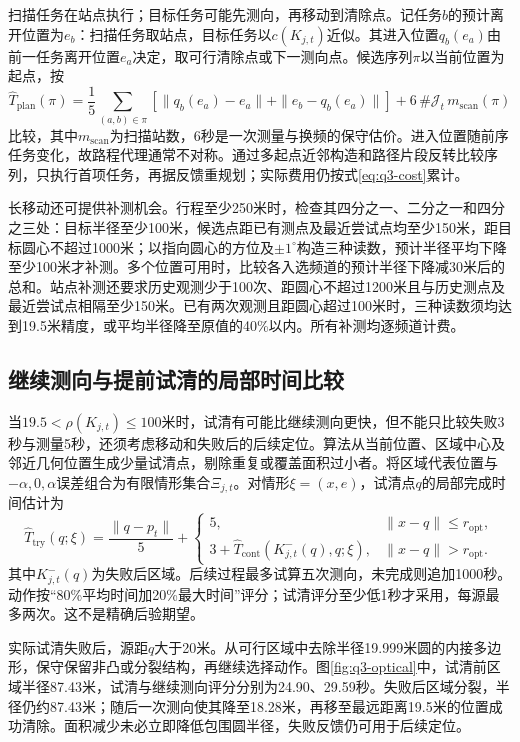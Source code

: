扫描任务在站点执行；目标任务可能先测向，再移动到清除点。记任务$b$的预计离开位置为$e_b$：扫描任务取站点，目标任务以$c(K_{j,t})$近似。其进入位置$q_b(e_a)$由前一任务离开位置$e_a$决定，取可行清除点或下一测向点。候选序列$\pi$以当前位置为起点，按
\begin{equation}
\widehat T_{\mathrm{plan}}(\pi)=
\frac15\sum_{(a,b)\in\pi}
\left[\|q_b(e_a)-e_a\|+\|e_b-q_b(e_a)\|\right]
+6\,\#\mathcal J_t\,m_{\mathrm{scan}}(\pi)
\label{eq:q3-route-score}
\end{equation}
比较，其中$m_{\mathrm{scan}}$为扫描站数，6秒是一次测量与换频的保守估价。进入位置随前序任务变化，故路程代理通常不对称。通过多起点近邻构造和路径片段反转比较序列，只执行首项任务，再据反馈重规划；实际费用仍按式\eqref{eq:q3-cost}累计。

长移动还可提供补测机会。行程至少250米时，检查其四分之一、二分之一和四分之三处：目标半径至少100米，候选点距已有测点及最近尝试点均至少150米，距目标圆心不超过1000米；以指向圆心的方位及$\pm1^\circ$构造三种读数，预计半径平均下降至少100米才补测。多个位置可用时，比较各入选频道的预计半径下降减30米后的总和。站点补测还要求历史观测少于100次、距圆心不超过1200米且与历史测点及最近尝试点相隔至少150米。已有两次观测且距圆心超过100米时，三种读数须均达到19.5米精度，或平均半径降至原值的40\%以内。所有补测均逐频道计费。

\subsection{继续测向与提前试清的局部时间比较}

当$19.5<\rho(K_{j,t})\le100$米时，试清有可能比继续测向更快，但不能只比较失败3秒与测量5秒，还须考虑移动和失败后的后续定位。算法从当前位置、区域中心及邻近几何位置生成少量试清点，剔除重复或覆盖面积过小者。将区域代表位置与$-\alpha,0,\alpha$误差组合为有限情形集合$\Xi_{j,t}$。对情形$\xi=(x,e)$，试清点$q$的局部完成时间估计为
\begin{equation}
\widehat T_{\mathrm{try}}(q;\xi)=\frac{\|q-p_t\|}{5}+
\begin{cases}
5,&\|x-q\|\le r_{\mathrm{opt}},\\
3+\widehat T_{\mathrm{cont}}(K^-_{j,t}(q),q;\xi),&\|x-q\|>r_{\mathrm{opt}}.
\end{cases}
\label{eq:q3-optical-value}
\end{equation}
其中$K^-_{j,t}(q)$为失败后区域。后续过程最多试算五次测向，未完成则追加1000秒。动作按“80\%平均时间加20\%最大时间”评分；试清评分至少低1秒才采用，每源最多两次。这不是精确后验期望。

实际试清失败后，源距$q$大于20米。从可行区域中去除半径19.999米圆的内接多边形，保守保留非凸或分裂结构，再继续选择动作。图\ref{fig:q3-optical}中，试清前区域半径87.43米，试清与继续测向评分分别为24.90、29.59秒。失败后区域分裂，半径仍约87.43米；随后一次测向使其降至18.28米，再移至最远距离19.5米的位置成功清除。面积减少未必立即降低包围圆半径，失败反馈仍可用于后续定位。

